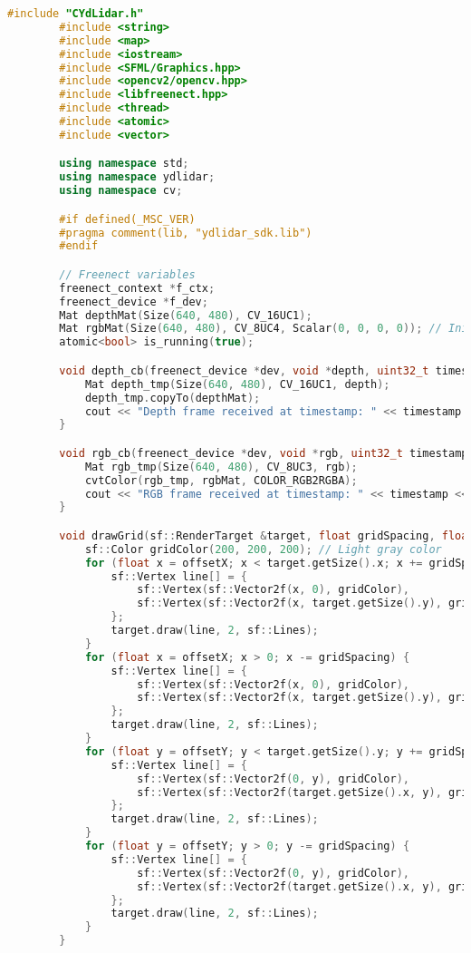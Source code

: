     \begin{lstlisting}[language={C++}, caption={C\'odigo de ejemplo de Kinect y LiDAR}, label={fresd}]
        #include "CYdLidar.h"
        #include <string>
        #include <map>
        #include <iostream>
        #include <SFML/Graphics.hpp>
        #include <opencv2/opencv.hpp>
        #include <libfreenect.hpp>
        #include <thread>
        #include <atomic>
        #include <vector>

        using namespace std;
        using namespace ydlidar;
        using namespace cv;

        #if defined(_MSC_VER)
        #pragma comment(lib, "ydlidar_sdk.lib")
        #endif

        // Freenect variables
        freenect_context *f_ctx;
        freenect_device *f_dev;
        Mat depthMat(Size(640, 480), CV_16UC1);
        Mat rgbMat(Size(640, 480), CV_8UC4, Scalar(0, 0, 0, 0)); // Initialize with transparent
        atomic<bool> is_running(true);

        void depth_cb(freenect_device *dev, void *depth, uint32_t timestamp) {
            Mat depth_tmp(Size(640, 480), CV_16UC1, depth);
            depth_tmp.copyTo(depthMat);
            cout << "Depth frame received at timestamp: " << timestamp << endl;
        }

        void rgb_cb(freenect_device *dev, void *rgb, uint32_t timestamp) {
            Mat rgb_tmp(Size(640, 480), CV_8UC3, rgb);
            cvtColor(rgb_tmp, rgbMat, COLOR_RGB2RGBA);
            cout << "RGB frame received at timestamp: " << timestamp << endl;
        }

        void drawGrid(sf::RenderTarget &target, float gridSpacing, float offsetX, float offsetY) {
            sf::Color gridColor(200, 200, 200); // Light gray color
            for (float x = offsetX; x < target.getSize().x; x += gridSpacing) {
                sf::Vertex line[] = {
                    sf::Vertex(sf::Vector2f(x, 0), gridColor),
                    sf::Vertex(sf::Vector2f(x, target.getSize().y), gridColor)
                };
                target.draw(line, 2, sf::Lines);
            }
            for (float x = offsetX; x > 0; x -= gridSpacing) {
                sf::Vertex line[] = {
                    sf::Vertex(sf::Vector2f(x, 0), gridColor),
                    sf::Vertex(sf::Vector2f(x, target.getSize().y), gridColor)
                };
                target.draw(line, 2, sf::Lines);
            }
            for (float y = offsetY; y < target.getSize().y; y += gridSpacing) {
                sf::Vertex line[] = {
                    sf::Vertex(sf::Vector2f(0, y), gridColor),
                    sf::Vertex(sf::Vector2f(target.getSize().x, y), gridColor)
                };
                target.draw(line, 2, sf::Lines);
            }
            for (float y = offsetY; y > 0; y -= gridSpacing) {
                sf::Vertex line[] = {
                    sf::Vertex(sf::Vector2f(0, y), gridColor),
                    sf::Vertex(sf::Vector2f(target.getSize().x, y), gridColor)
                };
                target.draw(line, 2, sf::Lines);
            }
        }


\end{lstlisting}
